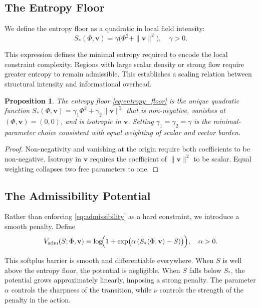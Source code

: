 \documentclass[11pt]{article}
\newtheorem{proposition}[theorem]{Proposition}
\theoremstyle{definition}
\begin{document}
\subsection{The Entropy Floor}

We define the entropy floor as a quadratic in local field intensity:
\begin{equation}
  S_*(\Phi, \mathbf{v}) = \gamma\bigl(\Phi^2 + \|\mathbf{v}\|^2\bigr),
  \quad \gamma > 0.
  \label{eq:entropy_floor}
\end{equation}

This expression defines the minimal entropy required to encode the local
constraint complexity. Regions with large scalar density or strong flow require
greater entropy to remain admissible. This establishes a scaling relation
between structural intensity and informational overhead.

\begin{proposition}
  The entropy floor \eqref{eq:entropy_floor} is the unique quadratic function
  $S_*(\Phi,\mathbf{v}) = \gamma_1\Phi^2 + \gamma_2\|\mathbf{v}\|^2$ that is
  non-negative, vanishes at $(\Phi,\mathbf{v}) = (0,0)$, and is isotropic in
  $\mathbf{v}$. Setting $\gamma_1 = \gamma_2 = \gamma$ is the
  minimal-parameter choice consistent with equal weighting of scalar and vector
  burden.
\end{proposition}

\begin{proof}
  Non-negativity and vanishing at the origin require both coefficients to be
  non-negative. Isotropy in $\mathbf{v}$ requires the coefficient of
  $\|\mathbf{v}\|^2$ to be scalar. Equal weighting collapses two free
  parameters to one.
\end{proof}

\subsection{The Admissibility Potential}

Rather than enforcing \eqref{eq:admissibility} as a hard constraint, we
introduce a smooth penalty. Define
\begin{equation}
  V_{\mathrm{adm}}(S;\Phi,\mathbf{v})
  = \log\!\Bigl(1 + \exp\bigl(\alpha\,(S_*(\Phi,\mathbf{v}) - S)\bigr)\Bigr),
  \quad \alpha > 0.
  \label{eq:Vadm}
\end{equation}

This softplus barrier is smooth and differentiable everywhere. When $S$ is well
above the entropy floor, the potential is negligible. When $S$ falls below
$S_*$, the potential grows approximately linearly, imposing a strong penalty.
The parameter $\alpha$ controls the sharpness of the transition, while $\nu$
controls the strength of the penalty in the action.
\end{document}
